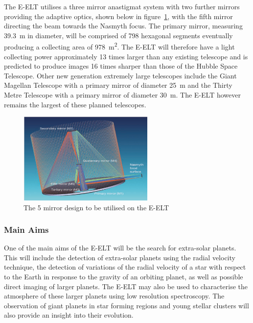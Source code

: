 	The E-ELT utilises a three mirror anastigmat system with two further mirrors providing the adaptive optics, shown below in figure~\ref{fig:5_mirror_eelt}, with the fifth mirror directing the beam towards the Nasmyth focus\cite[p.~16]{E_ELT_Construction_Proposal}. The primary mirror, measuring \SI{39.3}{\metre} in diameter, will be comprised of 798 hexagonal segments eventually producing a collecting area of \SI{978}{\square\metre}. The E-ELT will therefore have a light collecting power approximately 13 times larger than any existing telescope and is predicted to produce images 16 times sharper than those of the Hubble Space Telescope. Other new generation extremely large telescopes include the Giant Magellan Telescope with a primary mirror of diameter \SI{25}{\metre} and the Thirty Metre Telescope with a primary mirror of diameter \SI{30}{\metre}. The E-ELT however remains the largest of these planned telescopes.
	\begin{figure}[!htb]
		\centering
		\includegraphics[width=0.6\textwidth]{../Images/Anastigmat.png}
		\caption{The 5 mirror design to be utilised on the E-ELT}\label{fig:5_mirror_eelt}
	\end{figure}

	\subsubsection{Main Aims} %
	\label{ssub:main_aims}
		One of the main aims of the E-ELT will be the search for extra-solar planets.  This will include the detection of extra-solar planets using the radial velocity technique, the detection of variations of the radial velocity of a star with respect to the Earth in response to the gravity of an orbiting planet, as well as possible direct imaging of larger planets. The E-ELT may also be used to characterise the atmosphere of these larger planets using low resolution spectroscopy. The observation of giant planets in star forming regions and young stellar clusters will also provide an insight into their evolution.

